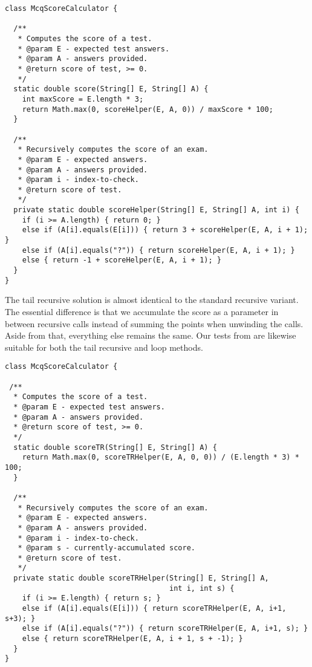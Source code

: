 \begin{lstlisting}[language=MyJava]
class McqScoreCalculator {

  /**
   * Computes the score of a test.
   * @param E - expected test answers.
   * @param A - answers provided.
   * @return score of test, >= 0.
   */
  static double score(String[] E, String[] A) {
    int maxScore = E.length * 3;
    return Math.max(0, scoreHelper(E, A, 0)) / maxScore * 100;
  }

  /**
   * Recursively computes the score of an exam.
   * @param E - expected answers.
   * @param A - answers provided.
   * @param i - index-to-check.
   * @return score of test.
   */
  private static double scoreHelper(String[] E, String[] A, int i) {
    if (i >= A.length) { return 0; }
    else if (A[i].equals(E[i])) { return 3 + scoreHelper(E, A, i + 1); }
    else if (A[i].equals("?")) { return scoreHelper(E, A, i + 1); }
    else { return -1 + scoreHelper(E, A, i + 1); }
  }
}
\end{lstlisting}

The tail recursive solution is almost identical to the standard recursive variant. The essential difference is that we accumulate the score as a parameter in between recursive calls instead of summing the points when unwinding the calls. Aside from that, everything else remains the same. Our tests from  are likewise suitable for both the tail recursive and loop methods.

\begin{lstlisting}[language=MyJava]
class McqScoreCalculator {

 /**
  * Computes the score of a test.
  * @param E - expected test answers.
  * @param A - answers provided.
  * @return score of test, >= 0.
  */
  static double scoreTR(String[] E, String[] A) {
    return Math.max(0, scoreTRHelper(E, A, 0, 0)) / (E.length * 3) * 100;
  }
 
  /**
   * Recursively computes the score of an exam.
   * @param E - expected answers.
   * @param A - answers provided.
   * @param i - index-to-check.
   * @param s - currently-accumulated score.
   * @return score of test.
   */
  private static double scoreTRHelper(String[] E, String[] A, 
                                      int i, int s) {
    if (i >= E.length) { return s; }
    else if (A[i].equals(E[i])) { return scoreTRHelper(E, A, i+1, s+3); }
    else if (A[i].equals("?")) { return scoreTRHelper(E, A, i+1, s); }
    else { return scoreTRHelper(E, A, i + 1, s + -1); }
  }
}
\end{lstlisting}

